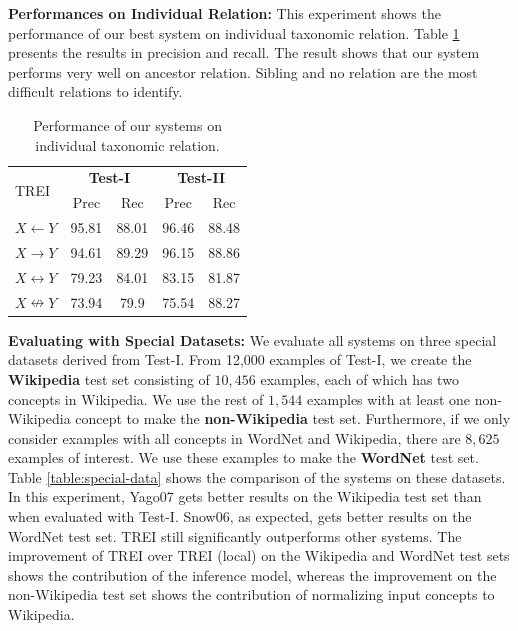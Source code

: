 {\bf Performances on Individual Relation:} This experiment shows the
performance of our best system on individual taxonomic relation.
Table \ref{tab:ind-rel} presents the results in precision and
recall. The result shows that our system performs very well on
ancestor relation. Sibling and no relation are the most difficult
relations to identify.

\begin{table}[!t]
  \begin{center}
    \begin{tabular}{l|c|c||c|c}
      \multirow{2}{*}{TREI}  & \multicolumn{2}{c}{{\bf Test-I}} & \multicolumn{2}{|c}{{\bf Test-II}} \\
      \cline{2-5}
      &  Prec & Rec &  Prec &  Rec  \\
      \hline
      $X \leftarrow Y$       & 95.81 & 88.01 & 96.46 & 88.48 \\
      $X \rightarrow Y$      & 94.61 & 89.29 & 96.15 & 88.86 \\
      $X \leftrightarrow Y$  & 79.23 & 84.01 & 83.15 & 81.87 \\
      $X \nleftrightarrow Y$ & 73.94 &  79.9 & 75.54 & 88.27 \\
    \end{tabular}
    \caption{Performance of our systems on individual taxonomic relation.}
    \label{tab:ind-rel}
  \end{center}
\end{table}


{\bf Evaluating with Special Datasets:} We evaluate all systems on
three special datasets derived from Test-I.  From 12,000 examples of
Test-I, we create the {\bf Wikipedia} test set consisting of $10,456$
examples, each of which has two concepts in Wikipedia. We use the rest
of $1,544$ examples with at least one non-Wikipedia concept to make
the {\bf non-Wikipedia} test set. Furthermore, if we only consider
examples with all concepts in WordNet and Wikipedia, there are $8,625$
examples of interest. We use these examples to make the {\bf WordNet}
test set. Table \ref{table:special-data} shows the comparison of the
systems on these datasets.  In this experiment, Yago07 gets better
results on the Wikipedia test set than when evaluated with Test-I.
Snow06, as expected, gets better results on the WordNet test set.
TREI still significantly outperforms other systems. The improvement of
TREI over TREI (local) on the Wikipedia and WordNet test sets shows
the contribution of the inference model, whereas the improvement on
the non-Wikipedia test set shows the contribution of normalizing input
concepts to Wikipedia.

